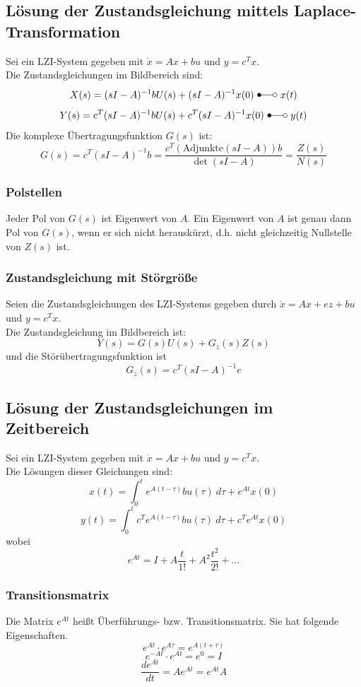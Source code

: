 \documentclass[10pt,a4paper]{article}
\begin{document}
\subsection{Lösung der Zustandsgleichung mittels Laplace-Transformation}
Sei ein LZI-System gegeben mit $\dot x = Ax + bu$ und $y = c^T x$. \\
Die Zustandsgleichungen im Bildbereich sind:
$$
	X(s) = (sI-A)^{-1} b U(s) + (sI-A)^{-1} x(0) ~\Laplace ~x(t)
$$
$$
	Y(s) = c^T(sI-A)^{-1} b U(s) + c^T (sI - A)^{-1} x(0) ~\Laplace ~y(t)
$$
Die komplexe Übertragungsfunktion $G(s)$ ist:
$$
	G(s) = c^T(sI - A)^{-1} b = \frac{c^T(\textrm{Adjunkte}(sI-A))b}{\det(sI-A)} = \frac{Z(s)}{N(s)}
$$

\subsubsection{Polstellen}
Jeder Pol von $G(s)$ ist Eigenwert von $A$. Ein Eigenwert von $A$ ist genau dann Pol von $G(s)$, wenn er sich nicht herauskürzt, d.h. nicht gleichzeitig Nullstelle von $Z(s)$ ist.

\subsubsection{Zustandsgleichung mit Störgröße}
Seien die Zustandsgleichungen des LZI-Systems gegeben durch $\dot x = Ax + ez + bu$ und $y = c^T x$. \\
Die Zustandsgleichung im Bildbereich ist:
$$
	Y(s) = G(s) U(s) + G_z(s) Z(s)
$$
und die Störübertragungsfunktion ist
$$
	G_z(s) = c^T(sI-A)^{-1}e
$$

\subsection{Lösung der Zustandsgleichungen im Zeitbereich}
Sei ein LZI-System gegeben mit $\dot x = Ax + bu$ und $y = c^T x$. \\
Die Lösungen dieser Gleichungen sind:
$$
	x(t) = \int_0^t e^{A(t-\tau)} b u(\tau) ~d\tau + e^{At} x(0)
$$
$$
	y(t) = \int_0^t c^T e^{A(t-\tau)} bu(\tau) ~d\tau + c^T e^{At} x(0)
$$
wobei
$$
	e^{At} = I + A\frac{t}{1!} + A^2 \frac{t^2}{2!} + \dots
$$

\subsubsection{Transitionsmatrix}
Die Matrix $e^{At}$ heißt Überführungs- bzw. Transitionsmatrix.
Sie hat folgende Eigenschaften.
$$
	e^{At} ⋅ e^{A\tau} = e^{A(t + \tau)}
$$
$$
	e^{-At} ⋅ e^{At} = e^0 = I
$$
$$	
	\frac{d e^{At}}{dt} = Ae^{At} = e^{At} A
$$
\end{document}
